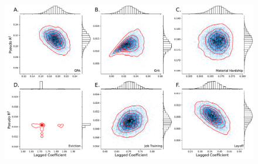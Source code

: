 \documentclass[12pt]{beamer}
\begin{document}
\begin{frame}
\begin{center}
\begin{figure}
\includegraphics[width=.925\linewidth]{../../figures//ffc_seeds.pdf} \\ \vspace{.025in}
\end{figure}
\end{center}
\end{frame}
\end{document}
